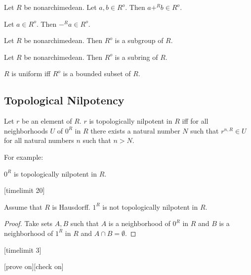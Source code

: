 \documentclass[11pt]{article}
\begin{document}
\begin{forthel}
\begin{lemma}[title = L 337] Let $R$ be nonarchimedean.
Let $a,b \in R^o$. Then $a +^{R} b \in R^o$.
\end{lemma}

\begin{lemma}[title = L 342]
Let $a \in R^o$. Then $-^{R} a \in R^o$.
\end{lemma}

\begin{lemma}[title = L 365] Let $R$ be nonarchimedean. Then
$R^o$ is a subgroup of $R$.
\end{lemma}

\begin{lemma}[title = L 371] Let $R$ be nonarchimedean. Then
$R^o$ is a subring of $R$.
\end{lemma}


\begin{definition}[title =  380]
$R$ is uniform iff $R^o$ is a bounded subset of $R$.
\end{definition}

\end{forthel}
\subsection{Topological Nilpotency}
\begin{forthel}


\begin{definition}[title = L 30] Let $r$ be an element of $R$. $r$ is topologically
nilpotent in $R$ iff for all neighborhoods $U$ of $0^{R}$ in $R$
there exists a natural number $N$ such that $r^{n,R} \in U$ 
for all natural numbers $n$
such that $n > N$.
\end{definition}

\end{forthel}
For example:
\begin{forthel}

\begin{lemma}
$0^{R}$ is topologically nilpotent in $R$.
\end{lemma}

[timelimit 20]
\begin{lemma} Assume that $R$ is Hausdorff.
$1^{R}$ is not topologically nilpotent in $R$.
\end{lemma}
\begin{proof}
Take sets $A,B$ such that $A$ is a neighborhood of $0^{R}$ in $R$
and $B$ is a neighborhood of $1^{R}$ in $R$ and
$A \cap B = \emptyset$.
\end{proof}
[timelimit 3]

[prove on][check on]
\end{forthel}
\end{document}

